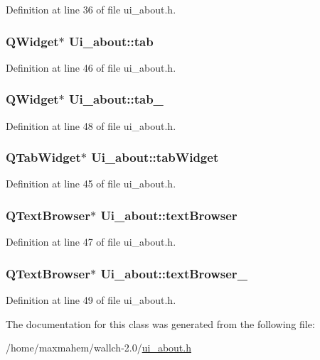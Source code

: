 Definition at line 36 of file ui\_\-about.h.

\hypertarget{classUi__about_a1849ee3563ac7a6e33685e5a8e3ef77a}{
\subsubsection[{tab}]{\setlength{\rightskip}{0pt plus 5cm}QWidget$\ast$ {\bf Ui\_\-about::tab}}}
\label{classUi__about_a1849ee3563ac7a6e33685e5a8e3ef77a}


Definition at line 46 of file ui\_\-about.h.

\hypertarget{classUi__about_adb6da8ff2f93532372eef3704898e677}{
\subsubsection[{tab\_\-2}]{\setlength{\rightskip}{0pt plus 5cm}QWidget$\ast$ {\bf Ui\_\-about::tab\_}}}
\label{classUi__about_adb6da8ff2f93532372eef3704898e677}


Definition at line 48 of file ui\_\-about.h.

\hypertarget{classUi__about_a3d168e9475d87a9889fa7cb50a9de5a8}{
\subsubsection[{tabWidget}]{\setlength{\rightskip}{0pt plus 5cm}QTabWidget$\ast$ {\bf Ui\_\-about::tabWidget}}}
\label{classUi__about_a3d168e9475d87a9889fa7cb50a9de5a8}


Definition at line 45 of file ui\_\-about.h.

\hypertarget{classUi__about_a9af2caf77c8d2dd709c0e7a893d8ae60}{
\subsubsection[{textBrowser}]{\setlength{\rightskip}{0pt plus 5cm}QTextBrowser$\ast$ {\bf Ui\_\-about::textBrowser}}}
\label{classUi__about_a9af2caf77c8d2dd709c0e7a893d8ae60}


Definition at line 47 of file ui\_\-about.h.

\hypertarget{classUi__about_a5105430ce15bd81a1a93d192f3ff0428}{
\subsubsection[{textBrowser\_\-2}]{\setlength{\rightskip}{0pt plus 5cm}QTextBrowser$\ast$ {\bf Ui\_\-about::textBrowser\_}}}
\label{classUi__about_a5105430ce15bd81a1a93d192f3ff0428}


Definition at line 49 of file ui\_\-about.h.



The documentation for this class was generated from the following file:\begin{DoxyCompactItemize}
\item 
/home/maxmahem/wallch-\/2.0/\hyperlink{ui__about_8h}{ui\_\-about.h}\end{DoxyCompactItemize}
